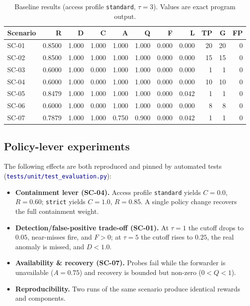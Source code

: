 \documentclass[11pt]{article}
\newcommand{\code}[1]{\texttt{\small #1}}
\newcommand{\file}[1]{\textcolor{navy}{\texttt{\small #1}}}
\begin{document}
\begin{table}[h]
\centering
\caption{Baseline results (access profile \code{standard}, $\tau=3$). Values are
exact program output.}
\label{tab:results}
\small
\begin{tabular}{l r rrrrrr rrr}
\toprule
\textbf{Scenario} & \textbf{R} & \textbf{D} & \textbf{C} & \textbf{A} & \textbf{Q} & \textbf{F} & \textbf{L} & \textbf{TP} & \textbf{G} & \textbf{FP}\\
\midrule
SC-01 & 0.8500 & 1.000 & 1.000 & 1.000 & 1.000 & 0.000 & 0.000 & 20 & 20 & 0\\
SC-02 & 0.8500 & 1.000 & 1.000 & 1.000 & 1.000 & 0.000 & 0.000 & 15 & 15 & 0\\
SC-03 & 0.6000 & 1.000 & 0.000 & 1.000 & 1.000 & 0.000 & 0.000 & 1 & 1 & 0\\
SC-04 & 0.6000 & 1.000 & 0.000 & 1.000 & 1.000 & 0.000 & 0.000 & 10 & 10 & 0\\
SC-05 & 0.8479 & 1.000 & 1.000 & 1.000 & 1.000 & 0.000 & 0.042 & 1 & 1 & 0\\
SC-06 & 0.6000 & 1.000 & 0.000 & 1.000 & 1.000 & 0.000 & 0.000 & 8 & 8 & 0\\
SC-07 & 0.7879 & 1.000 & 1.000 & 0.750 & 0.900 & 0.000 & 0.042 & 1 & 1 & 0\\
\bottomrule
\end{tabular}
\end{table}

\subsection{Policy-lever experiments}
The following effects are both reproduced and pinned by automated tests
(\file{tests/unit/test\_evaluation.py}):
\begin{itemize}[leftmargin=1.6em,nosep]
  \item \textbf{Containment lever (SC-04).} Access profile \code{standard} yields
        $C=0.0$, $R=0.60$; \code{strict} yields $C=1.0$, $R=0.85$. A single policy
        change recovers the full containment weight.
  \item \textbf{Detection/false-positive trade-off (SC-01).} At $\tau=1$ the
        cutoff drops to $0.05$, near-misses fire, and $F>0$; at $\tau=5$ the cutoff
        rises to $0.25$, the real anomaly is missed, and $D<1.0$.
  \item \textbf{Availability \& recovery (SC-07).} Probes fail while the forwarder
        is unavailable ($A=0.75$) and recovery is bounded but non-zero
        ($0<Q<1$).
  \item \textbf{Reproducibility.} Two runs of the same scenario produce identical
        rewards and components.
\end{itemize}
\end{document}
